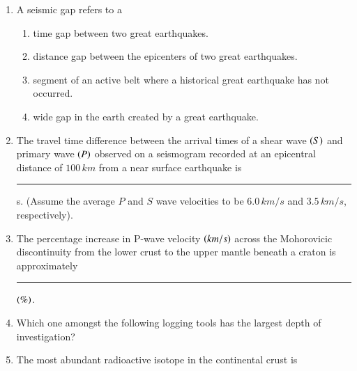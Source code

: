 \documentclass[journal,12pt,onecolumn]{IEEEtran}
\theoremstyle{remark}
\begin{document}
\begin{enumerate}
    \item A seismic gap refers to a \hfill{}
        \begin{enumerate} 
            \item time gap between two great earthquakes.
            \item distance gap between the epicenters of two great earthquakes.
            \item segment of an active belt where a historical great earthquake has not occurred.
            \item wide gap in the earth created by a great earthquake.
        \end{enumerate}
    
    \item The travel time difference between the arrival times of a shear wave $\left(S\right)$ and primary wave $\left(P\right)$ observed on a seismogram recorded at an epicentral distance of $100\,km$ from a near surface earthquake is \rule{3cm}{0.15mm}s. (Assume the average $P$ and $S$ wave velocities to be $6.0\,km/s $ and $3.5\,km/s $, respectively). \hfill{}
    
    \item The percentage increase in P-wave velocity $\left(km/s\right)$ across the Mohorovicic discontinuity from the lower crust to the upper mantle beneath a craton is approximately \rule{3cm}{0.15mm} $\left(\%\right)$. \hfill{}
    
    \item Which one amongst the following logging tools has the largest depth of investigation? \hfill{}
        \begin{enumerate} 
        \end{enumerate}
    
    \item The most abundant radioactive isotope in the continental crust is \hfill{}
        \begin{enumerate} 
        \end{enumerate}
    

\end{enumerate}
\end{document}
